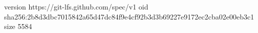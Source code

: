 version https://git-lfs.github.com/spec/v1
oid sha256:2b8d3dbc7015842a65d47dc84f9e4cf92b3d3b69227e9172ec2cba02e00eb3c1
size 5584
